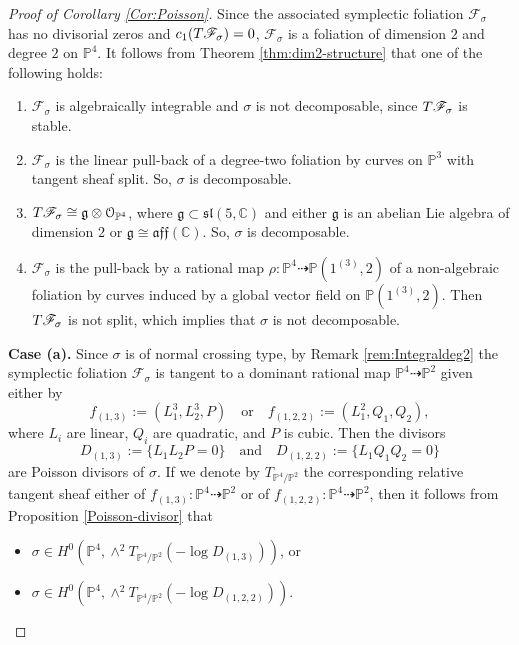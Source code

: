 \documentclass[twoside]{amsart}
\numberwithin{equation}{section}
\def\PP{{\mathbb{P}}}
\def\OO{\mathcal{O}}
\newcommand{\sF}{\mathscr{F}}
\newcommand{\tF}{{\rm T}\sF}
\theoremstyle{definition}
\begin{document}
\begin{proof}[Proof of Corollary \ref{Cor:Poisson}]
Since the associated symplectic foliation $\sF_\sigma$ has no divisorial zeros and
$c_1(\tF_\sigma) = 0$, $\sF_\sigma$ is a foliation of dimension $2$ and degree $2$
on $\PP^{4}$. It follows from Theorem \ref{thm:dim2-structure} that one of the
following holds:
\begin{enumerate}
\item[(a)] $\sF_\sigma$ is algebraically integrable and $\sigma$ is not decomposable,
since $\tF_\sigma$ is stable.

\item[(b)] $\sF_\sigma$ is the linear pull-back of a degree-two foliation by curves
on $\PP^{3}$ with tangent sheaf split. So, $\sigma$ is decomposable.

\item[(c)] $\tF_\sigma \cong \mathfrak{g}\otimes \OO_{\PP^{4}}$, where
$\mathfrak{g} \subset \mathfrak{sl}(5,\mathbb{C})$ and either $\mathfrak{g}$ is an
abelian Lie algebra of dimension $2$ or $\mathfrak{g} \cong \mathfrak{aff}(\mathbb{C})$.
So, $\sigma$ is decomposable.

\item[(d)] $\sF_\sigma$ is the pull-back by a rational map
$\rho\colon \PP^{4} \dashrightarrow \mathbb{P}(1^{(3)},2)$ of a non-algebraic foliation
by curves induced by a global vector field on $\mathbb{P}(1^{(3)},2)$. Then $\tF_\sigma$
is not split, which implies that $\sigma$ is not decomposable.
\end{enumerate}

\noindent \textbf{Case (a).}
Since $\sigma$ is of normal crossing type, by Remark \ref{rem:Integraldeg2} the
symplectic foliation $\sF_\sigma$ is tangent to a dominant rational map
$\PP^{4} \dashrightarrow \PP^{2}$ given either by
\[
f_{(1,3)} := (L_1^3, L_2^3, P)
\quad\text{or}\quad
f_{(1,2,2)} := (L_1^2, Q_1, Q_2),
\]
where $L_i$ are linear, $Q_i$ are quadratic, and $P$ is cubic. Then the divisors
\[
D_{(1,3)} := \{L_1 L_2 P = 0\}
\quad\text{and}\quad
D_{(1,2,2)} := \{L_1 Q_1 Q_2 = 0\}
\]
are Poisson divisors of $\sigma$. If we denote by
$T_{\PP^{4}/\PP^{2}}$ the corresponding relative tangent sheaf either of
$f_{(1,3)}\colon \PP^{4} \dashrightarrow \PP^{2}$ or of
$f_{(1,2,2)}\colon \PP^{4} \dashrightarrow \PP^{2}$, then it follows from
Proposition \ref{Poisson-divisor} that
\begin{itemize}
 \item $\sigma\in H^0(\PP^{4}, \wedge^2T_{\PP^{4}/\PP^{2}}(-\log D_{(1,3)}))$, or
 \item $\sigma\in H^0(\PP^{4}, \wedge^2T_{\PP^{4}/\PP^{2}}(-\log D_{(1,2,2)}))$.
\end{itemize}


\end{proof}
\end{document}
